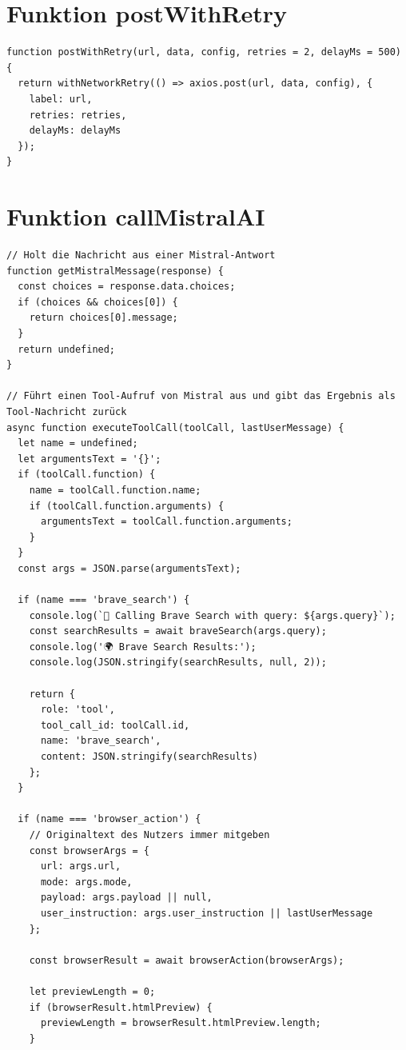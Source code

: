 \section{Funktion postWithRetry}

\begin{lstlisting}
function postWithRetry(url, data, config, retries = 2, delayMs = 500) {
  return withNetworkRetry(() => axios.post(url, data, config), {
    label: url,
    retries: retries,
    delayMs: delayMs
  });
}
\end{lstlisting}

\section{Funktion callMistralAI}

\begin{lstlisting}
// Holt die Nachricht aus einer Mistral-Antwort
function getMistralMessage(response) {
  const choices = response.data.choices;
  if (choices && choices[0]) {
    return choices[0].message;
  }
  return undefined;
}

// Führt einen Tool-Aufruf von Mistral aus und gibt das Ergebnis als Tool-Nachricht zurück
async function executeToolCall(toolCall, lastUserMessage) {
  let name = undefined;
  let argumentsText = '{}';
  if (toolCall.function) {
    name = toolCall.function.name;
    if (toolCall.function.arguments) {
      argumentsText = toolCall.function.arguments;
    }
  }
  const args = JSON.parse(argumentsText);

  if (name === 'brave_search') {
    console.log(`🔎 Calling Brave Search with query: ${args.query}`);
    const searchResults = await braveSearch(args.query);
    console.log('🌍 Brave Search Results:');
    console.log(JSON.stringify(searchResults, null, 2));

    return {
      role: 'tool',
      tool_call_id: toolCall.id,
      name: 'brave_search',
      content: JSON.stringify(searchResults)
    };
  }

  if (name === 'browser_action') {
    // Originaltext des Nutzers immer mitgeben
    const browserArgs = {
      url: args.url,
      mode: args.mode,
      payload: args.payload || null,
      user_instruction: args.user_instruction || lastUserMessage
    };

    const browserResult = await browserAction(browserArgs);

    let previewLength = 0;
    if (browserResult.htmlPreview) {
      previewLength = browserResult.htmlPreview.length;
    }


\end{lstlisting}
